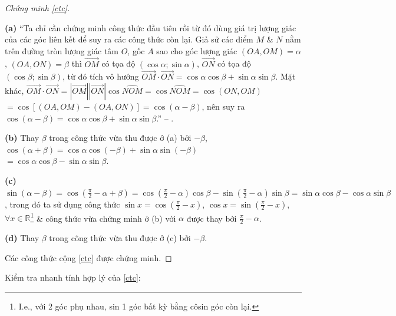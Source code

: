 \documentclass[oneside]{book}
\numberwithin{equation}{section}
\begin{document}
\begin{proof}[Chứng minh \eqref{ctc}]
	\begin{enumerate*}
		\item[\textbf{(a)}] ``Ta chỉ cần chứng minh công thức đầu tiên rồi từ đó dùng giá trị lượng giác của các góc liên kết để suy ra các công thức còn lại. Giả sử các điểm $M$ \& $N$ nằm trên đường tròn lượng giác tâm $O$, gốc $A$ sao cho góc lượng giác $(OA,OM) = \alpha$, $(OA,ON) = \beta$ thì $\overrightarrow{OM}$ có tọa độ $(\cos\alpha;\sin\alpha)$, $\overrightarrow{ON}$ có tọa độ $(\cos\beta;\sin\beta)$, từ đó tích vô hướng $\overrightarrow{OM}\cdot\overrightarrow{ON} = \cos\alpha\cos\beta + \sin\alpha\sin\beta$. Mặt khác, $\overrightarrow{OM}\cdot\overrightarrow{ON} = |\overrightarrow{OM}||\overrightarrow{ON}|\cos\widehat{NOM} = \cos\widehat{NOM} = \cos(ON,OM)$ $= \cos[(OA,OM) - (OA,ON)] = \cos(\alpha - \beta)$, nên suy ra $\cos(\alpha - \beta) = \cos\alpha\cos\beta + \sin\alpha\sin\beta$.'' -- \cite[pp. 5--6]{TL_chuyen_Toan_Dai_So_Giai_Tich_11}.
		\item[\textbf{(b)}] Thay $\beta$ trong công thức vừa thu được ở (a) bởi $-\beta$, $\cos(\alpha + \beta) = \cos\alpha\cos(-\beta) + \sin\alpha\sin(-\beta)$\\$= \cos\alpha\cos\beta - \sin\alpha\sin\beta$.
		\item[\textbf{(c)}] $\sin(\alpha - \beta) = \cos\left(\frac{\pi}{2} - \alpha + \beta\right) = \cos\left(\frac{\pi}{2} - \alpha\right)\cos\beta - \sin\left(\frac{\pi}{2} - \alpha\right)\sin\beta = \sin\alpha\cos\beta - \cos\alpha\sin\beta$, trong đó ta sử dụng công thức $\sin x = \cos\left(\frac{\pi}{2} - x\right)$, $\cos x = \sin\left(\frac{\pi}{2} - x\right)$, $\forall x\in\mathbb{R}$\footnote{I.e., với 2 góc phụ nhau, sin 1 góc bất kỳ bằng côsin góc còn lại.} \& công thức vừa chứng minh ở (b) với $\alpha$ được thay bởi $\frac{\pi}{2} - \alpha$.
		\item[\textbf{(d)}] Thay $\beta$ trong công thức vừa thu được ở (c) bởi $-\beta$.
	\end{enumerate*}
	Các công thức cộng \eqref{ctc} được chứng minh.
\end{proof}
Kiểm tra nhanh tính hợp lý của \eqref{ctc}:
\end{document}

